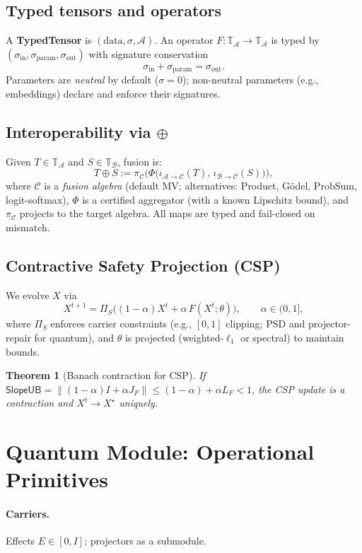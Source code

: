 \documentclass[11pt]{article}
\newtheorem{theorem}{Theorem}
\newcommand{\norm}[1]{\left\lVert #1 \right\rVert}
\begin{document}
\subsection{Typed tensors and operators}
A \textbf{TypedTensor} is $(\mathrm{data},\sigma,\mathcal{A})$. An operator $F:\mathbb{T}_\mathcal{A}\to\mathbb{T}_\mathcal{A}$ is typed by $(\sigma_{\text{in}},\sigma_{\text{param}},\sigma_{\text{out}})$ with signature conservation
\[
\sigma_{\text{in}}+\sigma_{\text{param}}=\sigma_{\text{out}}.
\]
Parameters are \emph{neutral} by default ($\sigma=0$); non-neutral parameters (e.g., embeddings) declare and enforce their signatures.

\subsection{Interoperability via $\oplus$}
Given $T\in\mathbb{T}_\mathcal{A}$ and $S\in\mathbb{T}_\mathcal{B}$, fusion is:
\[
T\oplus S := \pi_{\mathcal{C}}\!\Big(\Phi\big(\iota_{\mathcal{A}\to\mathcal{C}}(T),\,\iota_{\mathcal{B}\to\mathcal{C}}(S)\big)\Big),
\]
where $\mathcal{C}$ is a \emph{fusion algebra} (default MV; alternatives: Product, Gödel, ProbSum, logit-softmax), $\Phi$ is a certified aggregator (with a known Lipschitz bound), and $\pi_{\mathcal{C}}$ projects to the target algebra. All maps are typed and fail-closed on mismatch.

\subsection{Contractive Safety Projection (CSP)}
We evolve $X$ via
\[
X^{t+1}=\Pi_S\Big((1-\alpha)X^t+\alpha\,F(X^t;\theta)\Big),\qquad \alpha\in(0,1],
\]
where $\Pi_S$ enforces carrier constraints (e.g., $[0,1]$ clipping; PSD and projector-repair for quantum), and $\theta$ is projected (weighted-$\ell_1$ or spectral) to maintain bounds.

\begin{theorem}[Banach contraction for CSP]
If $\textsf{SlopeUB}=\norm{(1-\alpha)I+\alpha J_F}\le (1-\alpha)+\alpha L_F<1$, the CSP update is a contraction and $X^t\to X^\star$ uniquely.
\end{theorem}

\section{Quantum Module: Operational Primitives}
\paragraph{Carriers.} Effects $E\in[0,I]$; projectors as a submodule.
\end{document}
